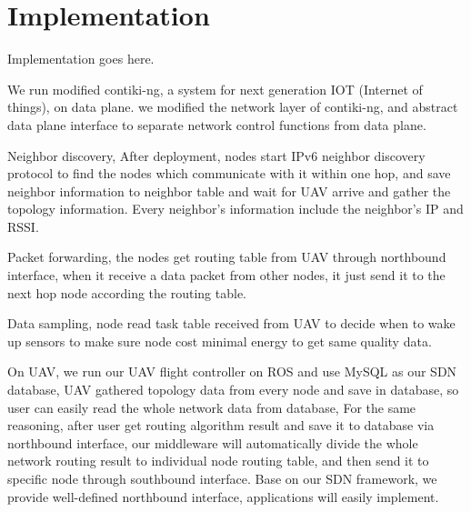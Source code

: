 \section{Implementation}
\label{Imp}

Implementation goes here.

We run modified contiki-ng, a system for next generation IOT (Internet of things), on data plane. we modified the network layer of contiki-ng, and abstract data plane interface to separate network control functions from data plane. 

Neighbor discovery, After deployment, nodes start IPv6 neighbor discovery protocol to find the nodes which communicate with it within one hop, and save neighbor information to neighbor table and wait for UAV arrive 
and gather the topology information. Every neighbor's information include the neighbor's IP and RSSI. 

Packet forwarding, the nodes get routing table from UAV through northbound interface, when it receive a data packet from other nodes, it just send it to the next hop node according the routing table.

Data sampling, node read task table received from UAV to decide when to wake up sensors to make sure node cost minimal energy to get same quality data. 

On UAV, we run our UAV flight controller on ROS and use MySQL as our SDN database, UAV gathered topology data from every node and save in database, 
so user can easily read the whole network data from database, For the same 
reasoning, after user get routing algorithm result and save it to database via northbound interface, 
our middleware will automatically divide the whole network routing result to individual node routing table, and then send it to specific node
through southbound interface. Base on our SDN framework, we provide well-defined northbound interface, applications will easily implement.